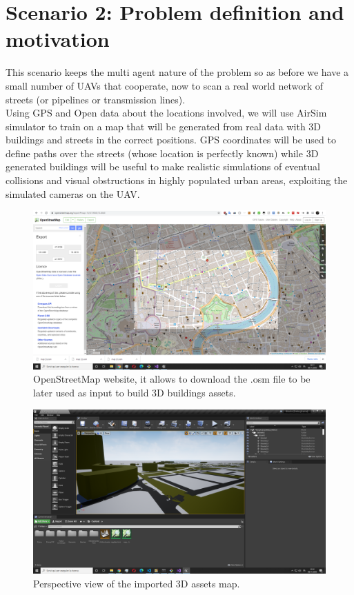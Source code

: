 \documentclass[LaM,binding=0.6cm]{sapthesis}
\begin{document}
\section*{Scenario 2: Problem definition and motivation}
This scenario keeps the multi agent nature of the problem so as before we have a small number of UAVs that cooperate, now to scan a real world network of streets (or pipelines or transmission lines). \\
Using GPS and Open data about the locations involved, we will use AirSim simulator to train on a map that will be generated from real data with 3D buildings and streets in the correct positions. GPS coordinates will be used to define paths over the streets (whose location is perfectly known) while 3D generated buildings will be useful to make realistic simulations of eventual collisions and visual obstructions in highly populated urban areas, exploiting the simulated cameras on the UAV.

\begin{figure}[hb!]
	\centering
	\includegraphics[width=1.0\columnwidth]{figures/Cattura3.PNG}
	\caption{OpenStreetMap website, it allows to download the .osm file to be later used as input to build 3D buildings assets.}
\end{figure}
\begin{figure}[!]
	\centering
	\includegraphics[width=1.0\columnwidth]{figures/Cattura5.PNG}
	\caption{Perspective view of the imported 3D assets map.}
\end{figure}
\end{document}
